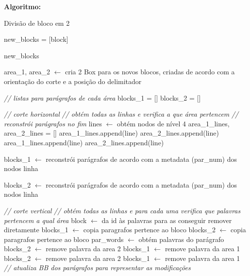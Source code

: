 \textbf{Algoritmo:}

\begin{breakablealgorithm}
	\caption{Divisão de bloco em 2}
	\footnotesize
	\begin{algorithmic}[1]
		
		\State new\_blocks = [block]
		
			\Return new\_blocks
		\EndIf
		
		\State area\_1, area\_2 $\leftarrow$ cria 2 Box para os novos blocos, criadas de acordo com a orientação do corte e a posição do delimitador
		
		\State \textit{// listas para parágrafos de cada área}
		\State blocks\_1 = []
		\State blocks\_2 = []
		
		\State \textit{// corte horizontal}
		\State \textit{// obtém todas as linhas e verifica a que área pertencem}
		\State \textit{// reconstrói parágrafos no fim}
			\State lines $\leftarrow$ obtém nodos de nível 4
			\State area\_1\_lines, area\_2\_lines = []
					\State area\_1\_lines.append(line)
					\State area\_2\_lines.append(line)
						\State area\_1\_lines.append(line)
					\Else
						\State area\_2\_lines.append(line)
					\EndIf
				\EndIf
			\EndFor
			
				\State blocks\_1 $\leftarrow$ reconstrói parágrafos de acordo com a metadata (par\_num) dos nodos linha
			\EndIf
			
			\State blocks\_2 $\leftarrow$ reconstrói parágrafos de acordo com a metadata (par\_num) dos nodos linha
			\EndIf
		
		\Else
			\State \textit{// corte vertical}
			\State \textit{// obtém todas as linhas e para cada uma verifica que palavras pertencem a qual área}
			\State block $\leftarrow$ da id às palavras para as conseguir remover diretamente
			\State blocks\_1 $\leftarrow$ copia paragrafos pertence ao bloco
			\State blocks\_2 $\leftarrow$ copia paragrafos pertence ao bloco
				\State par\_words $\leftarrow$ obtém palavras do parágrafo
						\State blocks\_2 $\leftarrow$ remove palavra da area 2
						\State blocks\_1 $\leftarrow$ remove palavra da area 1
							\State blocks\_2 $\leftarrow$ remove palavra da area 2
						\Else
							\State blocks\_1 $\leftarrow$ remove palavra da area 1
						\EndIf
					\EndIf
				\EndFor
				\State \textit{// atualiza BB dos parágrafos para representar as modificações}
			\EndFor
		\EndIf
		

\end{algorithmic}
\end{breakablealgorithm}
